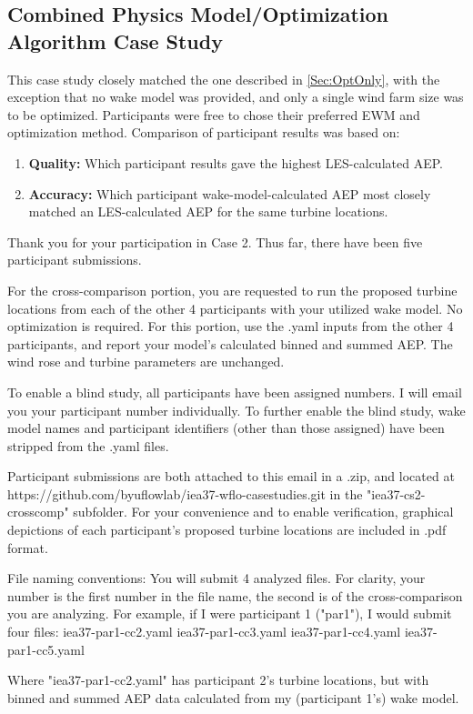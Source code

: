 \documentclass[]{aiaa-tc}
\begin{document}
\subsection{Combined Physics Model/Optimization Algorithm Case Study}
\label{Sec:Cmbnd}
This case study closely matched the one described in \cref{Sec:OptOnly}, with the exception that no wake model was provided, and only a single wind farm size was to be optimized. Participants were free to chose their preferred EWM and optimization method. Comparison of participant results was based on:
\begin{enumerate}
	\item \textbf{Quality:} Which participant results gave the highest LES-calculated AEP.
	\item \textbf{Accuracy:} Which participant wake-model-calculated AEP most closely matched an LES-calculated AEP for the same turbine locations.
\end{enumerate}Thank you for your participation in Case 2. Thus far, there have been five participant submissions.

For the cross-comparison portion, you are requested to run the proposed turbine locations from each of the other 4 participants with your utilized wake model. No optimization is required. For this portion, use the .yaml inputs from the other 4 participants, and report your model's calculated binned and summed AEP. The wind rose and turbine parameters are unchanged.

To enable a blind study, all participants have been assigned numbers. I will email you your participant number individually. To further enable the blind study, wake model names and participant identifiers (other than those assigned) have been stripped from the .yaml files.

Participant submissions are both attached to this email in a .zip, and located at https://github.com/byuflowlab/iea37-wflo-casestudies.git in the "iea37-cs2-crosscomp" subfolder. For your convenience and to enable verification, graphical depictions of each participant's proposed turbine locations are included in .pdf format.

File naming conventions:
You will submit 4 analyzed files. For clarity, your number is the first number in the file name, the second is of the cross-comparison you are analyzing.
For example, if I were participant 1 ("par1"), I would submit four files:
iea37-par1-cc2.yaml
iea37-par1-cc3.yaml
iea37-par1-cc4.yaml
iea37-par1-cc5.yaml

Where "iea37-par1-cc2.yaml" has participant 2's turbine locations, but with binned and summed AEP data calculated from my (participant 1's) wake model.
\end{document}
